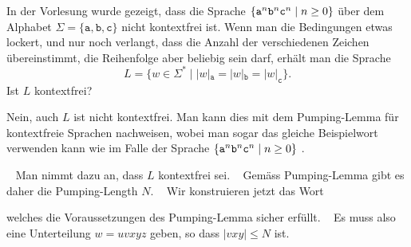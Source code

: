 In der Vorlesung wurde gezeigt, dass die Sprache
$\{\texttt{a}\mathstrut^n\texttt{b}\mathstrut^n\texttt{c}\mathstrut^n\;|\;n\ge 0\}$
über dem Alphabet $\Sigma=\{\texttt{a},\texttt{b},\texttt{c}\}$
nicht kontextfrei ist.
Wenn man die Bedingungen etwas lockert, und nur noch verlangt, dass die
Anzahl der verschiedenen Zeichen übereinstimmt, die Reihenfolge aber
beliebig sein darf, erhält man die Sprache
\[
L=\{w\in\Sigma^*\;|\;|w|_\texttt{a}=|w|_\texttt{b}=|w|_\texttt{c}\}.
\]
Ist $L$ kontextfrei?


\begin{loesung}
Nein, auch $L$ ist nicht kontextfrei.
Man kann dies mit dem Pumping-Lemma für kontextfreie Sprachen nachweisen,
wobei man sogar das gleiche Beispielwort verwenden kann wie im Falle der
Sprache $\{ \texttt{a}\mathstrut^n \texttt{b}\mathstrut^n \texttt{c}\mathstrut^n\;|\; n \ge 0\}$ .

~%
Man nimmt dazu an, dass $L$ kontextfrei sei.
~%
Gemäss Pumping-Lemma gibt es daher die Pumping-Length $N$.
~%
Wir konstruieren jetzt das Wort
\begin{center}
\end{center}
welches die Voraussetzungen
des Pumping-Lemma sicher erfüllt.
~%
Es muss also eine Unterteilung $w=uvxyz$ geben, so dass $|vxy|\le N$ ist.
\begin{center}
\end{center}
\end{loesung}
